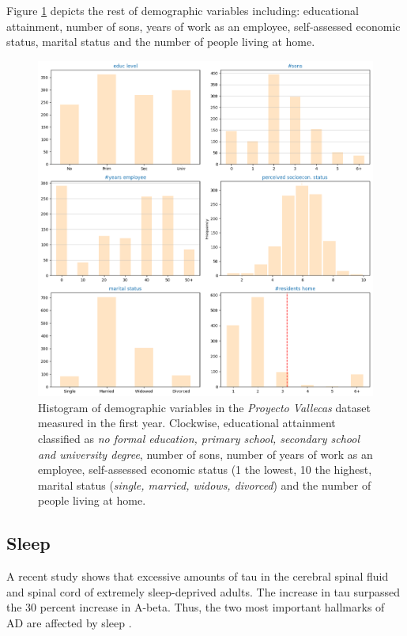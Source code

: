 \documentclass[11pt]{article}
\theoremstyle{definition}
\theoremstyle{remark}
\begin{document}
Figure \ref{fig:demo} depicts the rest of demographic variables including: educational attainment, number of sons, years of work as an employee, self-assessed economic status, marital status and the number of people living at home.
\begin{figure}[H]
        \centering
        \includegraphics[keepaspectratio, width=\linewidth]{figures/Fig_demo}
        \caption{Histogram of demographic variables in the \emph{Proyecto Vallecas} dataset measured in the first year. Clockwise, educational attainment classified as \emph{no formal education, primary school, secondary school and university degree}, number of sons, number of years of work as an employee, self-assessed economic status (1 the lowest, 10 the highest, marital status (\emph{single, married, widows, divorced}) and the number of people living at home.} 
        \label{fig:demo}
\end{figure}

\subsection{Sleep}
\label{ssse:sleep}

A recent study shows that excessive amounts of tau in the cerebral spinal fluid and spinal cord of extremely sleep-deprived adults. The increase in tau surpassed the 30 percent increase in A-beta. Thus, the two most important hallmarks of AD are affected by sleep \cite{holth2019sleep}.
\end{document}
